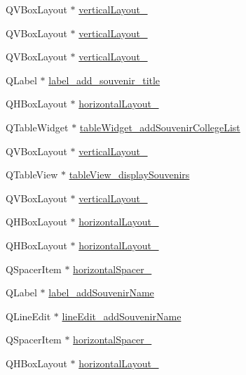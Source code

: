 \begin{DoxyCompactItemize}
\item 
Q\+V\+Box\+Layout $\ast$ \hyperlink{class_ui___main_window_a44a96bf6c50e331e1881f83744e5ccde}{vertical\+Layout\+\_}
\item 
Q\+V\+Box\+Layout $\ast$ \hyperlink{class_ui___main_window_a1b3a62c857fb43de0dc4541bdb9eacbd}{vertical\+Layout\+\_}
\item 
Q\+V\+Box\+Layout $\ast$ \hyperlink{class_ui___main_window_a73167f8ba1b7ab11acea316a893a717a}{vertical\+Layout\+\_}
\item 
Q\+Label $\ast$ \hyperlink{class_ui___main_window_a951041fe73d37cb4374bee3c8dd1b19d}{label\+\_\+add\+\_\+souvenir\+\_\+title}
\item 
Q\+H\+Box\+Layout $\ast$ \hyperlink{class_ui___main_window_a2cc82cfd5eb11ce1c3763e9e548a4e5d}{horizontal\+Layout\+\_}
\item 
Q\+Table\+Widget $\ast$ \hyperlink{class_ui___main_window_a8301e77cc2e7d12c5ca15377d7ae26b0}{table\+Widget\+\_\+add\+Souvenir\+College\+List}
\item 
Q\+V\+Box\+Layout $\ast$ \hyperlink{class_ui___main_window_a3d04e4752808d4545c12e07a83a5d76c}{vertical\+Layout\+\_}
\item 
Q\+Table\+View $\ast$ \hyperlink{class_ui___main_window_a3a7668aaca348f7f12a2015a3e905b93}{table\+View\+\_\+display\+Souvenirs}
\item 
Q\+V\+Box\+Layout $\ast$ \hyperlink{class_ui___main_window_a45a1fe3ab2eb20f88e396075d5ed35f6}{vertical\+Layout\+\_}
\item 
Q\+H\+Box\+Layout $\ast$ \hyperlink{class_ui___main_window_ace90ad79d857a577478bfb093959b3d6}{horizontal\+Layout\+\_}
\item 
Q\+H\+Box\+Layout $\ast$ \hyperlink{class_ui___main_window_acbfe65f9d2895246b00c82c815b5369e}{horizontal\+Layout\+\_}
\item 
Q\+Spacer\+Item $\ast$ \hyperlink{class_ui___main_window_aabc19a9b3dc140c22c4c72a1b060a7fd}{horizontal\+Spacer\+\_}
\item 
Q\+Label $\ast$ \hyperlink{class_ui___main_window_a868953fa955fccdcc19a7759a1322034}{label\+\_\+add\+Souvenir\+Name}
\item 
Q\+Line\+Edit $\ast$ \hyperlink{class_ui___main_window_a74b18cc07f8d086757a053001017d265}{line\+Edit\+\_\+add\+Souvenir\+Name}
\item 
Q\+Spacer\+Item $\ast$ \hyperlink{class_ui___main_window_ad6df069a1d0a8c9bfbbd8cc24f6fc783}{horizontal\+Spacer\+\_}
\item 
Q\+H\+Box\+Layout $\ast$ \hyperlink{class_ui___main_window_a801412ee7430cd8ba763b6925da8f85f}{horizontal\+Layout\+\_}

\end{DoxyCompactItemize}
